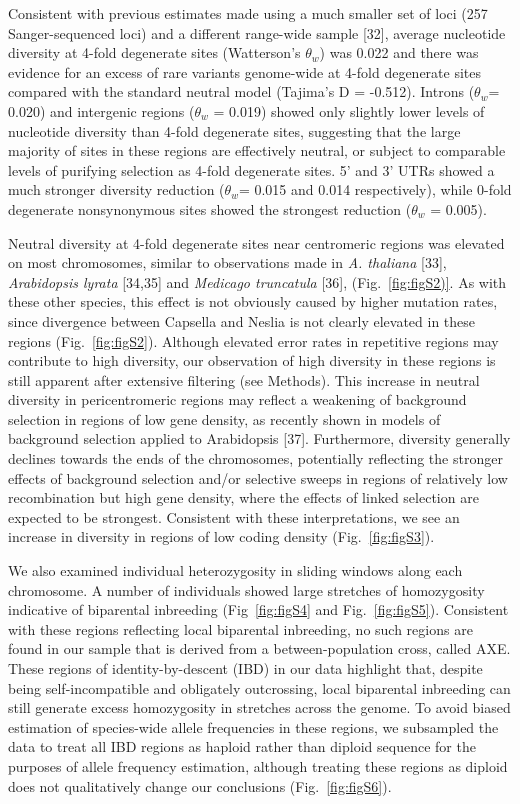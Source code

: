 Consistent with previous estimates made using a much smaller set of loci (257 Sanger-sequenced loci) and a different range-wide sample [32], average nucleotide diversity at 4-fold degenerate sites (Watterson’s $\theta_{w}$) was 0.022 and there was evidence for an excess of rare variants genome-wide at 4-fold degenerate sites compared with the standard neutral model (Tajima’s D = -0.512). Introns ($\theta_{w}$= 0.020) and intergenic regions ($\theta_{w}$ = 0.019) showed only slightly lower levels of nucleotide diversity than 4-fold degenerate sites, suggesting that the large majority of sites in these regions are effectively neutral, or subject to comparable levels of purifying selection as 4-fold degenerate sites. 5’ and 3’ UTRs showed a much stronger diversity reduction ($\theta_{w}$= 0.015 and 0.014 respectively), while 0-fold degenerate nonsynonymous sites showed the strongest reduction ($\theta_{w}$ = 0.005).

Neutral diversity at 4-fold degenerate sites near centromeric regions was elevated on most chromosomes, similar to observations made in \textit{A. thaliana} [33], \textit{Arabidopsis lyrata} [34,35] and \textit{Medicago truncatula} [36], (Fig.~\ref{fig:figS2)}. As with these other species, this effect is not obviously caused by higher mutation rates, since divergence between Capsella and Neslia is not clearly elevated in these regions (Fig.~\ref{fig:figS2}). Although elevated error rates in repetitive regions may contribute to high diversity, our observation of high diversity in these regions is still apparent after extensive filtering (see Methods). This increase in neutral diversity in pericentromeric regions may reflect a weakening of background selection in regions of low gene density, as recently shown in models of background selection applied to Arabidopsis [37].  Furthermore, diversity generally declines towards the ends of the chromosomes, potentially reflecting the stronger effects of background selection and/or selective sweeps in regions of relatively low recombination but high gene density, where the effects of linked selection are expected to be strongest. Consistent with these interpretations, we see an increase in diversity in regions of low coding density (Fig.~\ref{fig:figS3}).

We also examined individual heterozygosity in sliding windows along each chromosome. A number of individuals showed large stretches of homozygosity indicative of biparental inbreeding (Fig~\ref{fig:figS4} and Fig.~\ref{fig:figS5}). Consistent with these regions reflecting local biparental inbreeding, no such regions are found in our sample that is derived from a between-population cross, called AXE. These regions of identity-by-descent (IBD) in our data highlight that, despite being self-incompatible and obligately outcrossing, local biparental inbreeding can still generate excess homozygosity in stretches across the genome. To avoid biased estimation of species-wide allele frequencies in these regions, we subsampled the data to treat all IBD regions as haploid rather than diploid sequence for the purposes of allele frequency estimation, although treating these regions as diploid does not qualitatively change our conclusions (Fig.~\ref{fig:figS6}).

